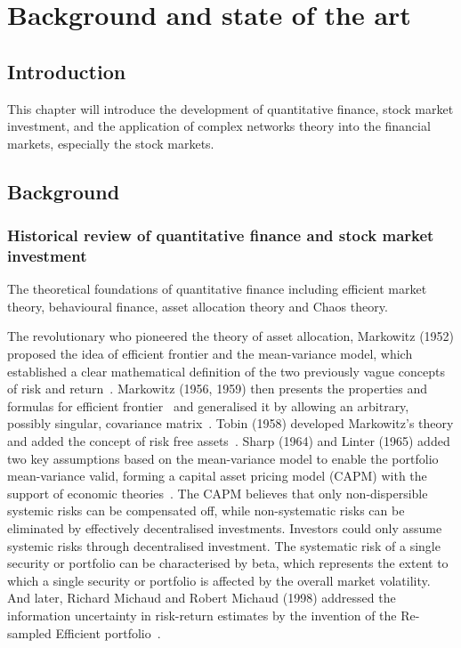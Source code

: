 \chapter[Background]{Background and state of the art}
\label{cpt:back}

\section{Introduction}
This chapter will introduce the development of quantitative finance, stock market investment, and the application of complex networks theory into the financial markets, especially the stock markets.

\section{Background}
\subsection{Historical review of quantitative finance and stock market investment}
The theoretical foundations of quantitative finance including efficient market theory, behavioural finance, asset allocation theory and Chaos theory.

The revolutionary who pioneered the theory of asset allocation, Markowitz (1952) proposed the idea of efficient frontier and the mean-variance model, which established a clear mathematical definition of the two previously vague concepts of risk and return~\cite{portfolio}. Markowitz (1956, 1959) then presents the properties and formulas for efficient frontier~\cite{markowitz1956optimization} and generalised it by allowing an arbitrary, possibly singular, covariance matrix~\cite{markowitz1959portfolio}. Tobin (1958) developed Markowitz's theory and added the concept of risk free assets~\cite{tobin1958liquidity}. Sharp (1964) and Linter (1965) added two key assumptions based on the mean-variance model to enable the portfolio mean-variance valid, forming a capital asset pricing model (CAPM) with the support of economic theories~\cite{equilibrium, diversification}. The CAPM believes that only non-dispersible systemic risks can be compensated off, while non-systematic risks can be eliminated by effectively decentralised investments. Investors could only assume systemic risks through decentralised investment. The systematic risk of a single security or portfolio can be characterised by beta, which represents the extent to which a single security or portfolio is affected by the overall market volatility. And later, Richard Michaud and Robert Michaud (1998) addressed the information uncertainty in risk-return estimates by the invention of the Re-sampled Efficient portfolio~\cite{michaud1998asset}.


